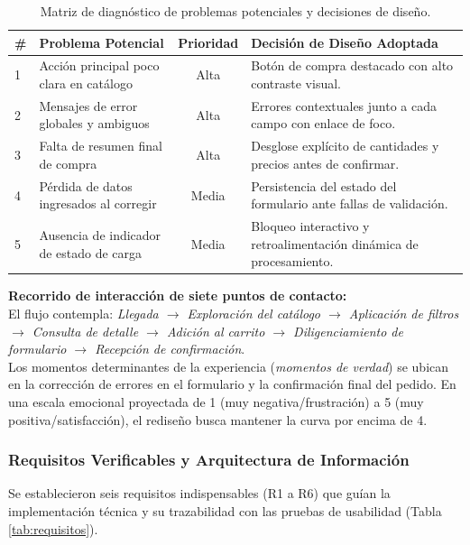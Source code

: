 \documentclass{article}
\begin{document}
\begin{table}[H]
\centering
\caption{Matriz de diagnóstico de problemas potenciales y decisiones de diseño.}
\label{tab:problemas}
\vspace{0.2cm}
\begin{tabularx}{\textwidth}{l p{4.5cm} c X}
\toprule
\textbf{\#} & \textbf{Problema Potencial} & \textbf{Prioridad} & \textbf{Decisión de Diseño Adoptada} \\
\midrule
1 & Acción principal poco clara en catálogo & Alta & Botón de compra destacado con alto contraste visual. \\
2 & Mensajes de error globales y ambiguos & Alta & Errores contextuales junto a cada campo con enlace de foco. \\
3 & Falta de resumen final de compra & Alta & Desglose explícito de cantidades y precios antes de confirmar. \\
4 & Pérdida de datos ingresados al corregir & Media & Persistencia del estado del formulario ante fallas de validación. \\
5 & Ausencia de indicador de estado de carga & Media & Bloqueo interactivo y retroalimentación dinámica de procesamiento. \\
\bottomrule
\end{tabularx}
\end{table}

\textbf{Recorrido de interacción de siete puntos de contacto:} \\
El flujo contempla: \textit{Llegada $\rightarrow$ Exploración del catálogo $\rightarrow$ Aplicación de filtros $\rightarrow$ Consulta de detalle $\rightarrow$ Adición al carrito $\rightarrow$ Diligenciamiento de formulario $\rightarrow$ Recepción de confirmación}. \\
Los momentos determinantes de la experiencia (\textit{momentos de verdad}) se ubican en la corrección de errores en el formulario y la confirmación final del pedido. En una escala emocional proyectada de 1 (muy negativa/frustración) a 5 (muy positiva/satisfacción), el rediseño busca mantener la curva por encima de 4.

\subsubsection{Requisitos Verificables y Arquitectura de Información}
Se establecieron seis requisitos indispensables (R1 a R6) que guían la implementación técnica y su trazabilidad con las pruebas de usabilidad (Tabla \ref{tab:requisitos}).
\end{document}
